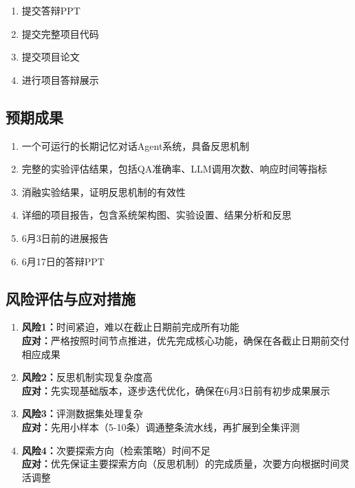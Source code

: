 \documentclass[11pt]{article}
\begin{document}
\begin{enumerate}
\item 提交答辩PPT
\item 提交完整项目代码
\item 提交项目论文
\item 进行项目答辩展示
\end{enumerate}

\subsection{预期成果}

\begin{enumerate}
\item 一个可运行的长期记忆对话Agent系统，具备反思机制
\item 完整的实验评估结果，包括QA准确率、LLM调用次数、响应时间等指标
\item 消融实验结果，证明反思机制的有效性
\item 详细的项目报告，包含系统架构图、实验设置、结果分析和反思
\item 6月3日前的进展报告
\item 6月17日的答辩PPT
\end{enumerate}

\subsection{风险评估与应对措施}

\begin{enumerate}
\item \textbf{风险1：}时间紧迫，难以在截止日期前完成所有功能 \\
      \textbf{应对：}严格按照时间节点推进，优先完成核心功能，确保在各截止日期前交付相应成果

\item \textbf{风险2：}反思机制实现复杂度高 \\
      \textbf{应对：}先实现基础版本，逐步迭代优化，确保在6月3日前有初步成果展示

\item \textbf{风险3：}评测数据集处理复杂 \\
      \textbf{应对：}先用小样本（5-10条）调通整条流水线，再扩展到全集评测

\item \textbf{风险4：}次要探索方向（检索策略）时间不足 \\
      \textbf{应对：}优先保证主要探索方向（反思机制）的完成质量，次要方向根据时间灵活调整
\end{enumerate}
\end{document}
